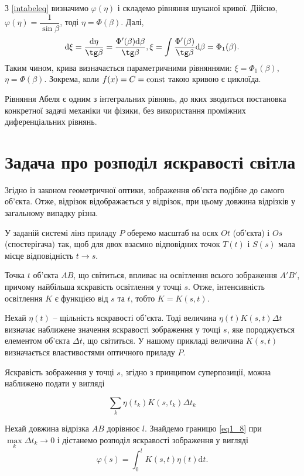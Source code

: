 \documentclass[14pt,twoside]{extreport}
\theoremstyle{mystyle}
\numberwithin{equation}{chapter}
\begin{document}
З \eqref{intabeleq} визначимо $\varphi (\eta )$ і складемо рівняння шуканої кривої. Дійсно, $\varphi (\eta )=\dfrac{1}{\sin \beta} $, тоді $\eta =\Phi (\beta )$. Далі,
\[\mathrm{d}\xi =\frac{\mathrm{d}\eta} {\tg\beta} =\frac{\Phi '(\beta )\mathrm{d}\beta} {\tg\beta}, \xi =\int  \frac{\Phi '(\beta )}{\tg\beta} \mathrm{d}\beta =\Phi _{1} (\beta).\]
Таким чином, крива визначається параметричними рівняннями: $\xi =\Phi _{1} (\beta )$, $\eta =\Phi (\beta)$. Зокрема, коли $f(x)=C={\rm const}$ такою кривою є циклоїда.

Рівняння Абеля є одним з інтегральних рівнянь, до яких зводиться постановка конкретної задачі механіки чи фізики, без використання проміжних диференціальних рівнянь.

\section{Задача про розподіл яскравості світла}

Згідно із законом геометричної оптики, зображення об'єкта подібне до самого об'єкта. Отже, відрізок відображається у відрізок, при цьому довжина відрізків у загальному випадку різна.

У заданій системі лінз приладу $P$ оберемо масштаб на осях $Ot$ (об'єкта) і $Os$ (спостерігача) так, щоб для двох взаємно відповідних точок $T(t)$ і $S(s)$ мала місце відповідність $t \to s$.

Точка $t$ об'єкта $AB$, що світиться, впливає на освітлення всього зображення $A'B'$, причому найбільша яскравість освітлення у точці $s$. Отже, інтенсивність освітлення $K$ є функцією від $s$ та $t$, тобто $K=K(s,t)$.

Нехай $\eta (t)$ -- щільність яскравості об'єкта. Тоді величина $\eta(t) K(s,t)\Delta t$ визначає наближене значення яскравості зображення у точці $s$, яке породжується елементом об'єкта $\Delta t$, що світиться. У нашому прикладі величина $K(s,t)$ визначається властивостями оптичного приладу $P$.

Яскравість зображення у точці $s$, згідно з принципом суперпозиції, можна наближено подати у вигляді

\begin{equation} \label{eq1_8}
\sum _{k}\eta(t_{k})K(s,t_{k} )\Delta t_{k}
\end{equation}

Нехай довжина відрізка $AB$ дорівнює $l$. Знайдемо границю \eqref{eq1_8} при $\max\limits_{k} \Delta t_{k} \to 0$ і дістанемо розподіл яскравості зображення у вигляді
\begin{equation} \label{eq1_9}
\varphi (s)=\int_{0}^{l} K(s,t) \eta(t)\mathrm{d}t.
\end{equation}
\end{document}
